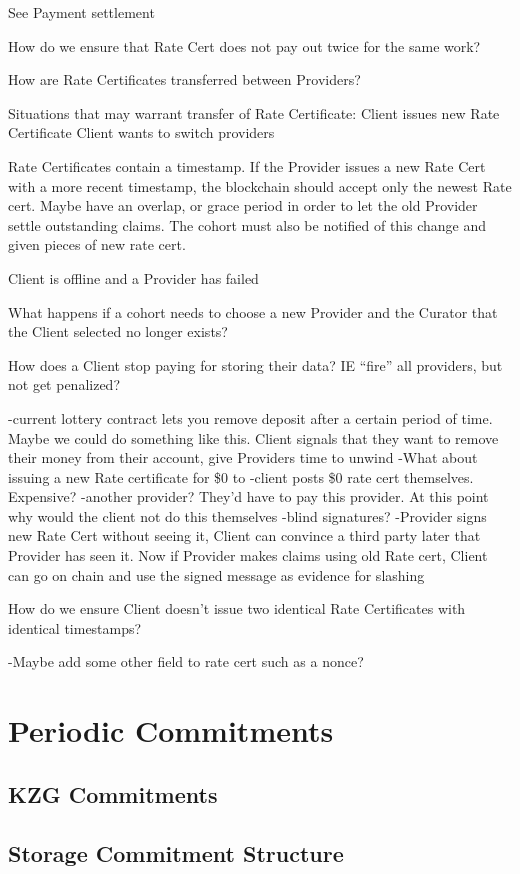 \documentclass{article}
\begin{document}
See Payment settlement

How do we ensure that Rate Cert does not pay out twice for the same work?

How are Rate Certificates transferred between Providers?

Situations that may warrant transfer of Rate Certificate: 
Client issues new Rate Certificate
Client wants to switch providers
	
Rate Certificates contain a timestamp. If the Provider issues a new Rate Cert with a more recent timestamp, the blockchain should accept only the newest Rate cert. Maybe have an overlap, or grace period in order to let the old Provider settle outstanding claims. The cohort must also be notified of this change and given pieces of new rate cert.	

Client is offline and a Provider has failed


What happens if a cohort needs to choose a new Provider and the Curator that the Client selected no longer exists?

How does a Client stop paying for storing their data? IE “fire” all providers, but not get penalized?

-current lottery contract lets you remove deposit after a certain period of time. Maybe we could do something like this. Client signals that they want to remove their money from their account, give Providers time to unwind
-What about issuing a new Rate certificate for \$0 to
	-client posts \$0 rate cert themselves. Expensive?
	-another provider? They’d have to pay this provider. At this point why would the client not do this themselves
-blind signatures?
	-Provider signs new Rate Cert without seeing it, Client can convince a third party later that Provider has seen it. Now if Provider makes claims using old Rate cert, Client can go on chain and use the signed message as evidence for slashing

How do we ensure Client doesn’t issue two identical Rate Certificates with identical timestamps?

-Maybe add some other field to rate cert such as a nonce?


\section{Periodic Commitments}
\subsection{KZG Commitments}
\subsection{Storage Commitment Structure}
\end{document}
